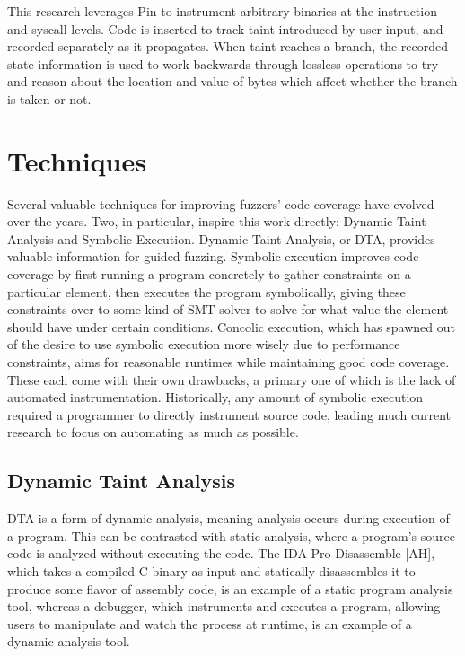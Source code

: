 \documentclass[11pt,expanded,copyright]{fsuthesis}
\begin{document}
This research leverages Pin to instrument arbitrary binaries at the instruction and syscall levels. Code is inserted to track taint introduced by user input, and recorded separately as it propagates. When taint reaches a branch, the recorded state information is used to work backwards through lossless operations to try and reason about the location and value of bytes which affect whether the branch is taken or not.

\section{Techniques}

Several valuable techniques for improving fuzzers' code coverage have evolved over the years. Two, in particular, inspire this work directly: Dynamic Taint Analysis and Symbolic Execution. Dynamic Taint Analysis, or DTA, provides valuable information for guided fuzzing. Symbolic execution improves code coverage by first running a program concretely to gather constraints on a particular element, then executes the program symbolically, giving these constraints over to some kind of SMT solver to solve for what value the element should have under certain conditions. Concolic execution, which has spawned out of the desire to use symbolic execution more wisely due to performance constraints, aims for reasonable runtimes while maintaining good code coverage. These each come with their own drawbacks, a primary one of which is the lack of automated instrumentation. Historically, any amount of symbolic execution required a programmer to directly instrument source code, leading much current research to focus on automating as much as possible.

\subsection{Dynamic Taint Analysis}

DTA is a form of dynamic analysis, meaning analysis occurs during execution of a program. This can be contrasted with static analysis, where a program's source code is analyzed without executing the code. The IDA Pro Disassemble [AH], which takes a compiled C binary as input and statically disassembles it to produce some flavor of assembly code, is an example of a static program analysis tool, whereas a debugger, which instruments and executes a program, allowing users to manipulate and watch the process at runtime, is an example of a dynamic analysis tool.
\end{document}
